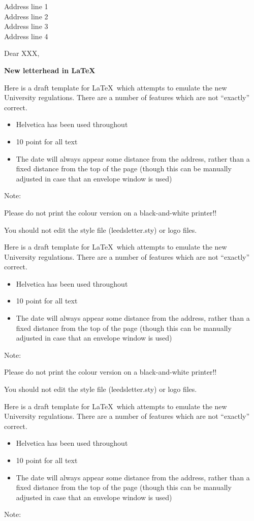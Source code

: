 \documentclass[a4paper]{letter}
\begin{document}
 
\begin{letter} 
{Address line 1\\
Address line 2\\
Address line 3\\
Address line 4}

 
 
 
\opening{Dear XXX,}
\medskip 
\centerline{\bf New letterhead in \LaTeX} 
\medskip 
Here is a draft template for  \LaTeX\ which attempts to emulate the new University regulations.  There are a number of features which are not ``exactly'' correct. 
\begin{itemize} 
\item Helvetica has been used throughout 
\item 10 point for all text  
\item  The date will always appear some distance from the address, rather than a fixed distance from the top of the page (though this can be manually adjusted in case that  
an envelope window is used) 
\end{itemize}
Note:
{\bf 

Please do not print the colour version on a black-and-white printer!! 

You should not edit the style file (leedsletter.sty) or logo files. }
 
\medskip 
Here is a draft template for  \LaTeX\ which attempts to emulate the new University regulations.  There are a number of features which are not ``exactly'' correct. 
\begin{itemize} 
\item Helvetica has been used throughout 
\item 10 point for all text  
\item  The date will always appear some distance from the address, rather than a fixed distance from the top of the page (though this can be manually adjusted in case that  
an envelope window is used) 
\end{itemize}
Note:
{\bf 

Please do not print the colour version on a black-and-white printer!! 

You should not edit the style file (leedsletter.sty) or logo files. }


\medskip 
Here is a draft template for  \LaTeX\ which attempts to emulate the new University regulations.  There are a number of features which are not ``exactly'' correct. 
\begin{itemize} 
\item Helvetica has been used throughout 
\item 10 point for all text  
\item  The date will always appear some distance from the address, rather than a fixed distance from the top of the page (though this can be manually adjusted in case that  
an envelope window is used) 
\end{itemize}
Note:
{\bf 

}
\end{letter}
\end{document}
